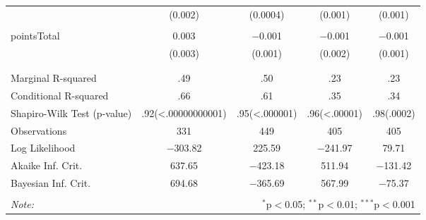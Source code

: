 \begin{table}[!htbp]
\begin{tabular}{@{\extracolsep{5pt}}lcccc}
  & (0.002) & (0.0004) & (0.001) & (0.001) \\ 
  & & & & \\ 
 pointsTotal & 0.003 & $-$0.001 & $-$0.001 & $-$0.001 \\ 
  & (0.003) & (0.001) & (0.002) & (0.001) \\ 
  & & & & \\ 
\hline \\[-1.8ex] 
Marginal R-squared & .49 & .50 & .23 & .23 \\ 
Conditional R-squared & .66 & .61 & .35 & .34 \\ 
Shapiro-Wilk Test (p-value) & .92(<.00000000001) & .95(<.000001) & .96(<.00001) & .98(.0002) \\ 
Observations & 331 & 449 & 405 & 405 \\ 
Log Likelihood & $-$303.82 & 225.59 & $-$241.97 & 79.71 \\ 
Akaike Inf. Crit. & 637.65 & $-$423.18 & 511.94 & $-$131.42 \\ 
Bayesian Inf. Crit. & 694.68 & $-$365.69 & 567.99 & $-$75.37 \\ 
\hline 
\hline \\[-1.8ex] 
\textit{Note:}  & \multicolumn{4}{r}{$^{*}$p$<$0.05; $^{**}$p$<$0.01; $^{***}$p$<$0.001} \\ 
\end{tabular} 
\end{table} 
